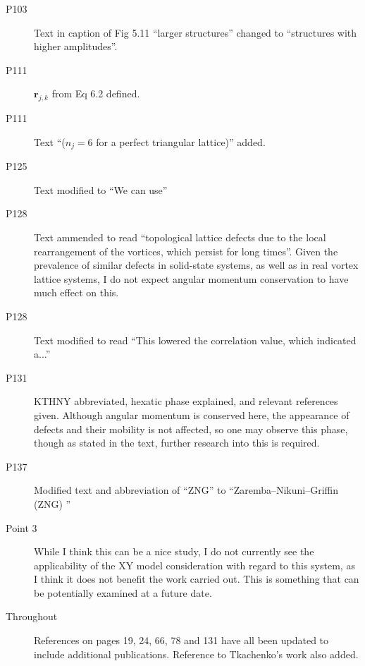 \documentclass[paper=a4, fontsize=12pt]{scrartcl}
\begin{document}
\begin{description}
    \item [P103] Text in caption of Fig 5.11 ``larger structures'' changed to ``structures with higher amplitudes''.
    \item [P111] $\mathbf{r}_{j,k}$ from Eq 6.2 defined.
    \item [P111] Text ``($n_j=6$ for a perfect triangular lattice)'' added.
    \item [P125] Text modified to ``We can use''
    \item [P128] Text ammended to read ``topological lattice defects due to the local rearrangement of the vortices, which persist for long times''. Given the prevalence of similar defects in solid-state systems, as well as in real vortex lattice systems, I do not expect angular momentum conservation to have much effect on this.
    \item [P128] Text modified to read ``This lowered the correlation value, which indicated a...''
    \item [P131] KTHNY abbreviated, hexatic phase explained, and relevant references given. Although angular momentum is conserved here, the appearance of defects and their mobility is not affected, so one may observe this phase, though as stated in the text, further research into this is required.
    \item [P137] Modified text and abbreviation of ``ZNG'' to ``Zaremba--Nikuni--Griffin (ZNG) ''

    \item [Point 3] While I think this can be a nice study, I do not currently see the applicability of the XY model consideration with regard to this system, as I think it does not benefit the work carried out. This is something that can be potentially examined at a future date.

    \item [Throughout] References on pages 19, 24, 66, 78 and 131 have all been updated to include additional publications. Reference to Tkachenko's work also added.
\end{description}
\end{document}
